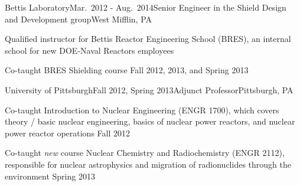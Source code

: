 \begin{rSubsection}{Bettis Laboratory}{Mar.\ 2012 - Aug.\ 2014}{Senior Engineer in the Shield Design and Development group}{West Mifflin, PA}
\item Qualified instructor for Bettis Reactor Engineering School (BRES), an internal school for new DOE-Naval Reactors employees
\item Co-taught BRES Shielding course Fall 2012, 2013, and Spring 2013
\end{rSubsection}

\clearpage
\begin{rSubsection}{University of Pittsburgh}{Fall 2012, Spring 2013}{Adjunct Professor}{Pittsburgh, PA}
\item Co-taught Introduction to Nuclear Engineering (ENGR 1700), which covers theory / basic nuclear engineering, basics of nuclear power reactors, and nuclear power reactor operations Fall 2012
\item Co-taught \textit{new} course Nuclear Chemistry and Radiochemistry (ENGR 2112), responsible for nuclear astrophysics and migration of radionuclides through the environment Spring 2013
\end{rSubsection}



%
